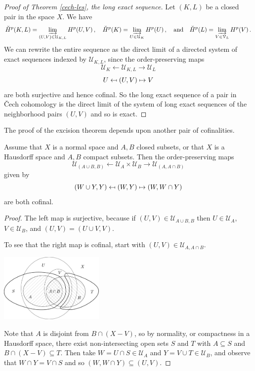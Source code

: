 \begin{proof}[Proof of Theorem \ref{cech-les}, the long exact sequence]
Let $(K,L)$ be a closed pair in the space $X$. We have
\[
\check{H}^p(K,L)=\varinjlim_{(U,V)\in\mathcal{U}_{K,L}}H^p(U,V)\,,
\quad
\check{H}^p(K)=\varinjlim_{U\in\mathcal{U}_K}H^p(U)\,,
\quad\hbox{and}\quad 
\check{H}^p(L)=\varinjlim_{V\in\mathcal{V}_L}H^p(V)\,.
\]
We can rewrite the entire sequence as
the direct limit of a directed system of exact sequences indexed by 
$\mathcal{U}_{K,L}$, since the order-preserving maps 
\[
\mathcal{U}_K \leftarrow \mathcal{U}_{K,L} \rightarrow \mathcal{U}_L 
\]
\[
U \mathrel{\reflectbox{$\mapsto$}} (U,V) \mapsto V
\]
are both surjective and hence cofinal. So the long exact sequence of a pair
in \v{C}ech cohomology is the direct limit of the system of long exact 
sequences of the neighborhood pairs $(U,V)$ and so is exact. 
\end{proof}

The proof of the excision theorem depends upon another pair of 
cofinalities.

\begin{lemma} Assume that $X$ is a normal space and $A,B$ closed subsets,
or that $X$ is a Hausdorff space and $A, B$ compact subsets.  
Then the order-preserving maps
\[
\mathcal{U}_{(A\cup B,B)} \leftarrow \mathcal{U}_A\times\mathcal{U}_B 
\rightarrow \mathcal{U}_{(A,A\cap B)}
\]
given by
\[
(W\cup Y,Y)\mathrel{\reflectbox{$\mapsto$}}(W,Y)\mapsto(W,W\cap Y)
\]
are both cofinal.
\label{lem-cofinal} 
\end{lemma}
\begin{proof}
The left map is surjective, because if $(U,V)\in\mathcal{U}_{A\cup B,B}$
then $U\in\mathcal{U}_A$, $V\in\mathcal{U}_B$, and $(U,V)=(U\cup V,V)$. 

To see that the right map is cofinal, start with 
$(U,V)\in\mathcal{U}_{A,A\cap B}$.

\medskip
\begin{center}
\includegraphics[width=2in]{905/Figures/35-cofinal-pair-lemma.pdf}
\end{center}

\noindent
Note that $A$ is disjoint from $B\cap(X-V)$, so by normality,
or compactness in a Hausdorff space, there exist
non-intersecting open sets $S$ and $T$ with $A\subseteq S$ and 
$B\cap(X-V)\subseteq T$. Then take $W=U\cap S\in\mathcal{U}_A$ and 
$Y=V\cup T\in\mathcal{U}_B$, and observe that $W\cap Y=V\cap S$ and so 
$(W,W\cap Y)\subseteq(U,V)$.
\end{proof}

